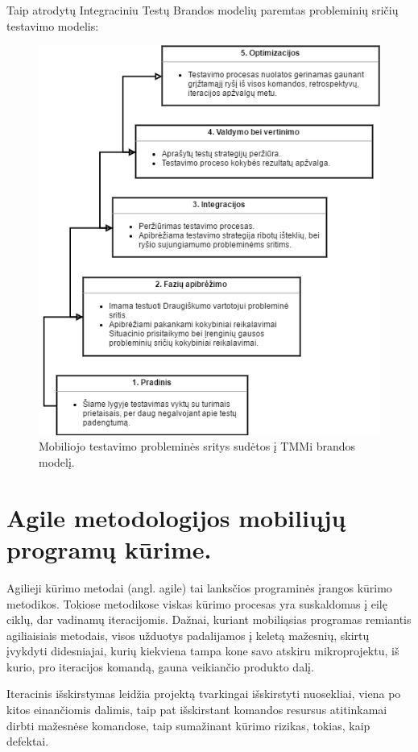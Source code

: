 \documentclass{VUMIFPSkursinis}
\begin{document}
Taip atrodytų Integraciniu Testų Brandos modelių paremtas probleminių sričių testavimo modelis:
\begin{figure}[H]
    \centering
    \includegraphics[scale=0.85]{img/Tmmimobile}
    \caption{Mobiliojo testavimo probleminės sritys sudėtos į TMMi brandos modelį.}
    \label{img:tmmimobile}
\end{figure}

\section{Agile metodologijos mobiliųjų programų kūrime.}
Agilieji kūrimo metodai (angl. agile) tai lanksčios programinės įrangos kūrimo metodikos. Tokiose metodikose viskas kūrimo procesas yra suskaldomas į eilę ciklų, dar vadinamų iteracijomis. Dažnai, kuriant mobiliąsias programas remiantis agiliaisiais metodais, visos užduotys padalijamos į keletą mažesnių, skirtų įvykdyti didesniajai, kurių kiekviena tampa kone savo atskiru mikroprojektu, iš kurio, pro iteracijos komandą, gauna veikiančio produkto dalį.

Iteracinis išskirstymas leidžia projektą tvarkingai išskirstyti nuosekliai, viena po kitos einančiomis dalimis, taip pat išskirstant komandos resursus atitinkamai dirbti mažesnėse komandose, taip sumažinant kūrimo rizikas, tokias, kaip defektai.
\end{document}

